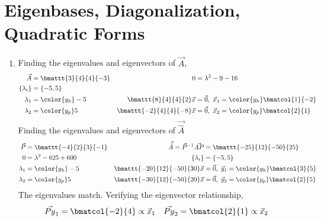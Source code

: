 \section{Eigenbases, Diagonalization, Quadratic Forms}

\begin{enumerate}
    \item Finding the eigenvalues and eigenvectors of $ \vec{A} $,
          \begin{align}
              \vec{A}                       & = \bmattt{3}{4}{4}{-3} &
              0                             & = \lambda^2 - 9 - 16     \\
              \{\lambda_i\}                 & = \{-5, 5\}              \\
              \lambda_1                     & = \color{y_h} -5       &
              \bmattt{8}{4}{4}{2} \vec{x}   & = \vec{0},\
              \vec{x}_1 = \color{y_h} \bmatcol{1}{-2}                  \\
              \lambda_2                     & = \color{y_p} 5        &
              \bmattt{-2}{4}{4}{-8} \vec{x} & = \vec{0},\
              \vec{x}_2 = \color{y_p} \bmatcol{2}{1}
          \end{align}
          Finding the eigenvalues and eigenvectors of $ \vec{\hat{A}} $
          \begin{align}
              \vec{P}                              & = \bmattt{-4}{2}{3}{-1}     &
              \vec{\hat{A}} = \vec{P}^{-1}\vec{AP} & = \bmattt{-25}{12}{-50}{25}   \\
              0                                    & = \lambda^2 - 625 + 600     &
              \{\lambda_i\}                        & = \{-5, 5\}                   \\
              \lambda_1                            & = \color{y_h} -5            &
              \bmattt{-20}{12}{-50}{30} \vec{x}    & = \vec{0},\
              \vec{y}_1 = \color{y_h} \bmatcol{3}{5}                               \\
              \lambda_2                            & = \color{y_p} 5             &
              \bmattt{-30}{12}{-50}{20} \vec{x}    & = \vec{0},\
              \vec{y}_2 = \color{y_p} \bmatcol{2}{5}
          \end{align}
          The eigenvalues match. Verifying the eigenvector relationship,
          \begin{align}
              \vec{Py}_1 & = \bmatcol{-2}{4} \propto \vec{x}_1 &
              \vec{Py}_2 & = \bmatcol{2}{1} \propto \vec{x}_2
          \end{align}


\end{enumerate}
